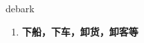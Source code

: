 
\begin{frame}
{\huge debark}
\begin{center}
\begin{enumerate}\Large
  \item \textbf{下船，下车，卸货，卸客等}
\end{enumerate}
\end{center}
\end{frame}
